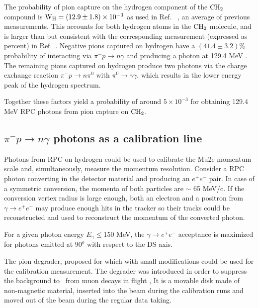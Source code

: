 The probability of pion capture on the hydrogen component of the $\rm{CH_2}$ compound is
$\newline \rm{ W_H = (12.9 \pm 1.8) \times 10^{-3 }}$
 as used in Ref.~\cite{RPC_1991_Harston_PhysRevA.44.103}
 , an average of previous measurements. 
 This accounts for both hydrogen atoms in the $\rm{CH_2}$ molecule, and is larger than but consistent with the
 corresponding measurement (expressed as percent) in Ref.~\cite{RPC_1972_Bistirlich_PhysRevC.5.1867}.
 Negative pions captured on hydrogen have a $ (41.4 \pm 3.2) \% $
 probability of interacting via $\pi^{-} p \to n \gamma$ and producing a photon at 129.4 MeV
 \cite{RPC_1972_Bistirlich_PhysRevC.5.1867}.
 The remaining pions captured on hydrogen produce two photons via the charge exchange reaction
 $ \pi^{-} p \to n \pi^0 $ with $\pi^0  \to \gamma \gamma $,
 which results in the lower energy peak of the hydrogen spectrum. 

Together these factors yield a probability of around $ 5 \times 10^{-3} $
for obtaining 129.4 MeV RPC photons from pion capture on $\rm{CH_2}$.

\subsection{$\pi^- p \to n \gamma$ photons as a calibration line }

Photons from RPC on hydrogen could be used to calibrate the Mu2e momentum scale and,
simultaneously, measure the momentum resolution.
Consider a RPC  photon converting in the detector material 
and producing an $e^+e^-$ pair. In case of a symmetric conversion, the momenta of both particles
are $\sim$ 65 MeV/c. If the conversion vertex radius is large enough, both an electron
and a positron from $\gamma \to e^+ e^-$ may produce enough hits in the tracker
so their tracks could be reconstructed and used to reconstruct the momentum of the
converted photon.

For a given photon energy $E_\gamma \leq 150$ MeV, the $\gamma \to e^+e^-$ acceptance
is maximized for photons emitted at $90^o$ with respect to the DS axis. 

The pion degrader, proposed for which with small modifications could be used
for the calibration measurement. The degrader was introduced in order to suppress
the background to \piplusenu\ from muon decays in flight \cite{MU2E_2527_PIPLUSENU},
It is a movable disk made of non-magnetic material, inserted into the beam during
the calibration runs and moved out of the beam during the regular data taking.

